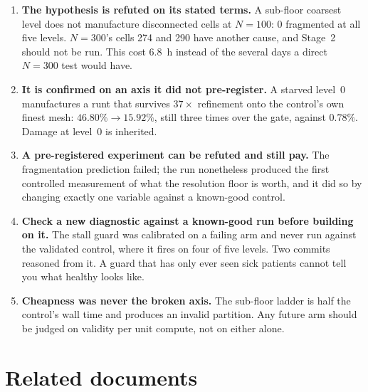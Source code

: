 \documentclass[11pt,a4paper]{article}
\begin{document}
\begin{enumerate}
  \item \textbf{The hypothesis is refuted on its stated terms.} A sub-floor
    coarsest level does not manufacture disconnected cells at \(N{=}100\): 0
    fragmented at all five levels. \(N{=}300\)'s cells 274 and 290 have another
    cause, and Stage~2 should not be run. This cost 6.8~h instead of the several
    days a direct \(N{=}300\) test would have.
  \item \textbf{It is confirmed on an axis it did not pre-register.} A starved
    level~0 manufactures a runt that survives \(37\times\) refinement onto the
    control's own finest mesh: \(46.80\% \to 15.92\%\), still three times over
    the gate, against \(0.78\%\). Damage at level~0 is inherited.
  \item \textbf{A pre-registered experiment can be refuted and still pay.} The
    fragmentation prediction failed; the run nonetheless produced the first
    controlled measurement of what the resolution floor is worth, and it did so
    by changing exactly one variable against a known-good control.
  \item \textbf{Check a new diagnostic against a known-good run before building
    on it.} The stall guard was calibrated on a failing arm and never run against
    the validated control, where it fires on four of five levels. Two commits
    reasoned from it. A guard that has only ever seen sick patients cannot tell
    you what healthy looks like.
  \item \textbf{Cheapness was never the broken axis.} The sub-floor ladder is
    half the control's wall time and produces an invalid partition. Any future
    arm should be judged on validity per unit compute, not on either alone.
\end{enumerate}

\section*{Related documents}
\end{document}
